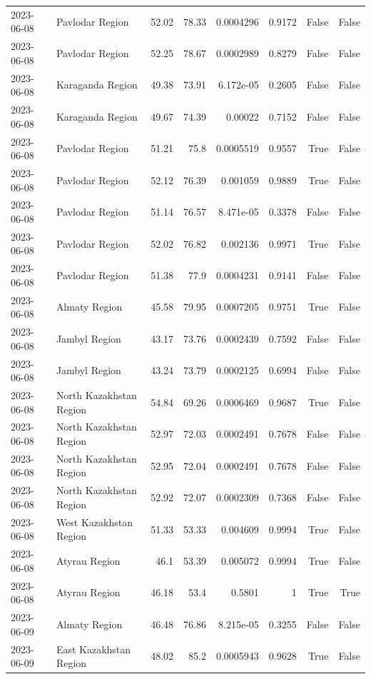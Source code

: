 \begin{table}
\begin{tabular}{llrrrrrr}
2023-06-08 & Pavlodar Region & 52.02 & 78.33 & 0.0004296 & 0.9172 & False & False \\
2023-06-08 & Pavlodar Region & 52.25 & 78.67 & 0.0002989 & 0.8279 & False & False \\
2023-06-08 & Karaganda Region & 49.38 & 73.91 & 6.172e-05 & 0.2605 & False & False \\
2023-06-08 & Karaganda Region & 49.67 & 74.39 & 0.00022 & 0.7152 & False & False \\
2023-06-08 & Pavlodar Region & 51.21 & 75.8 & 0.0005519 & 0.9557 & True & False \\
2023-06-08 & Pavlodar Region & 52.12 & 76.39 & 0.001059 & 0.9889 & True & False \\
2023-06-08 & Pavlodar Region & 51.14 & 76.57 & 8.471e-05 & 0.3378 & False & False \\
2023-06-08 & Pavlodar Region & 52.02 & 76.82 & 0.002136 & 0.9971 & True & False \\
2023-06-08 & Pavlodar Region & 51.38 & 77.9 & 0.0004231 & 0.9141 & False & False \\
2023-06-08 & Almaty Region & 45.58 & 79.95 & 0.0007205 & 0.9751 & True & False \\
2023-06-08 & Jambyl Region & 43.17 & 73.76 & 0.0002439 & 0.7592 & False & False \\
2023-06-08 & Jambyl Region & 43.24 & 73.79 & 0.0002125 & 0.6994 & False & False \\
2023-06-08 & North Kazakhstan Region & 54.84 & 69.26 & 0.0006469 & 0.9687 & True & False \\
2023-06-08 & North Kazakhstan Region & 52.97 & 72.03 & 0.0002491 & 0.7678 & False & False \\
2023-06-08 & North Kazakhstan Region & 52.95 & 72.04 & 0.0002491 & 0.7678 & False & False \\
2023-06-08 & North Kazakhstan Region & 52.92 & 72.07 & 0.0002309 & 0.7368 & False & False \\
2023-06-08 & West Kazakhstan Region & 51.33 & 53.33 & 0.004609 & 0.9994 & True & False \\
2023-06-08 & Atyrau Region & 46.1 & 53.39 & 0.005072 & 0.9994 & True & False \\
2023-06-08 & Atyrau Region & 46.18 & 53.4 & 0.5801 & 1 & True & True \\
2023-06-09 & Almaty Region & 46.48 & 76.86 & 8.215e-05 & 0.3255 & False & False \\
2023-06-09 & East Kazakhstan Region & 48.02 & 85.2 & 0.0005943 & 0.9628 & True & False \\

\end{tabular}
\end{table}
